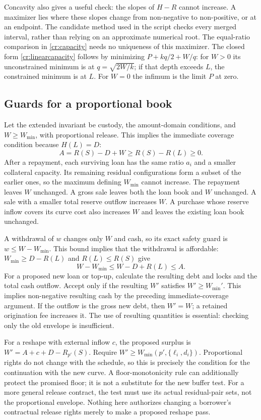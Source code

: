 Concavity also gives a useful check: the slopes of $H-R$ cannot increase. A maximizer lies where these slopes change from non-negative to non-positive, or at an endpoint. The candidate method used in the script checks every merged interval, rather than relying on an approximate numerical root. The equal-ratio comparison in \cref{cr:capacity} needs no uniqueness of this maximizer. The closed form \eqref{cr:linearcapacity} follows by minimizing $P+kq/2+W/q$: for $W>0$ its unconstrained minimum is at $q=\sqrt{2W/k}$; if that depth exceeds $L$, the constrained minimum is at $L$. For $W=0$ the infimum is the limit $P$ at zero.

\subsection{Guards for a proportional book}\label{cr:guards}

Let the extended invariant be custody, the amount-domain conditions, and $W\ge W_{\min}$, with proportional release. This implies the immediate coverage condition because $H(L)=D$:
\[
A=R(S)-D+W\ge R(S)-R(L)\ge0.
\]
After a repayment, each surviving loan has the same ratio $a_i$ and a smaller collateral capacity. Its remaining residual configurations form a subset of the earlier ones, so the maximum defining $W_{\min}$ cannot increase. The repayment leaves $W$ unchanged. A gross sale leaves both the loan book and $W$ unchanged. A sale with a smaller total reserve outflow increases $W$. A purchase whose reserve inflow covers its curve cost also increases $W$ and leaves the existing loan book unchanged.

A withdrawal of $w$ changes only $W$ and cash, so its exact safety guard is $w\le W-W_{\min}$. This bound implies that the withdrawal is affordable: $W_{\min}\ge D-R(L)$ and $R(L)\le R(S)$ give
\[
W-W_{\min}\le W-D+R(L)\le A.
\]
For a proposed new loan or top-up, calculate the resulting debt and locks and the total cash outflow. Accept only if the resulting $W'$ satisfies $W'\ge W_{\min}'$. This implies non-negative resulting cash by the preceding immediate-coverage argument. If the outflow is the gross new debt, then $W'=W$; a retained origination fee increases it. The use of resulting quantities is essential: checking only the old envelope is insufficient.

For a reshape with external inflow $c$, the proposed surplus is $W'=A+c+D-R_{p'}(S)$. Require $W'\ge W_{\min}(p',\{\ell_i,d_i\})$. Proportional rights do not change with the schedule, so this is precisely the condition for the continuation with the new curve. A floor-monotonicity rule can additionally protect the promised floor; it is not a substitute for the new buffer test. For a more general release contract, the test must use its actual residual-pair sets, not the proportional envelope. Nothing here authorizes changing a borrower's contractual release rights merely to make a proposed reshape pass.

